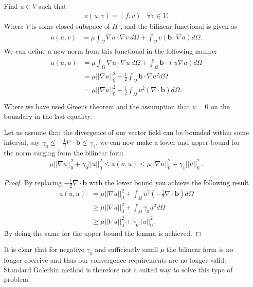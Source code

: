 Find $u \in V$ such that
%
\begin{align}
	a(u,v) = (f,v) \; \; \; \forall v \in V.
	\label{eq:varFormDiffFEM}
\end{align}
%
Where $V$ is some closed subspace of $H^1$, and the bilinear functional is given as 
%
\begin{align}
	\begin{split}
	a(u,v) &= \mu\int_{\Omega}\nabla u \cdot \nabla v \: d\Omega 
	+ \int_{\Omega} v (\mathbf{b} \cdot \nabla u) d \Omega.
	\end{split}
	\label{eq:bilinearFunctional}
\end{align}
%
We can define a new norm from this functional in the following manner
%
\begin{align}
\begin{split}
	a(u,u) &= \mu\int_{\Omega}\nabla u \cdot \nabla u \: d\Omega 
	+ \int_{\Omega}  \mathbf{b} \cdot (u\nabla u) d \Omega\\
	       &= \mu||\nabla u||^2_0 
	+ \frac{1}{2}\int_{\Omega} \mathbf{b} \cdot \nabla u^2 d \Omega \\
	       &= \mu||\nabla u||^2_0 
	- \frac{1}{2}\int_{\Omega} u^2  (\nabla \cdot \mathbf{b})  d \Omega. \\
\end{split}
	\label{eq:bilinearFunctional}
\end{align}
%
Where we have used Greens theorem and the assumption that $u=0$ on the boundary in the last equality. 

\begin{lemma}
Let us assume that the divergence of our vector field can be bounded within some interval, say  $\gamma_0 \leq -\frac{1}{2}\nabla \cdot \mathbf{b} \leq \gamma_1 $, we can now make a lower and upper bound for the norm surging from the bilinear form 
%
\begin{align}
	\mu||\nabla u||^2_0 + \gamma_0||u||^2_0 \leq a(u,u) \leq \mu||\nabla u||^2_0 + \gamma_1||u||^2_0\; .
	\label{eq:bilinearOperatorBounds}
\end{align}
%
\end{lemma}
%
\begin{proof}
By replacing $-\frac{1}{2}\nabla \cdot \mathbf{b} $ with the lower bound you achieve the following result
\begin{align}
 a(u,u) &= \mu||\nabla u||^2_0 +
	\int_{\Omega} u^2 (- \frac{1}{2}\nabla \cdot \mathbf{b}) d \Omega \\
	&\geq \mu||\nabla u||^2_0 
	+ \int_{\Omega} \gamma_0 u^2 d \Omega \\
	&\geq \mu||\nabla u||^2_0 
	+ \gamma_0|| u||_0^2.
	\label{eq:proof}
\end{align}
By doing the same for the upper bound the lemma is achieved.
\end{proof}
It is clear that for negative $\gamma_0$ and sufficiently small $\mu$ the bilinear form is no longer coercive and thus our convergence requirements are no longer valid. Standard Galerkin method is therefore not a suited way to solve this type of problem. 
%
%
